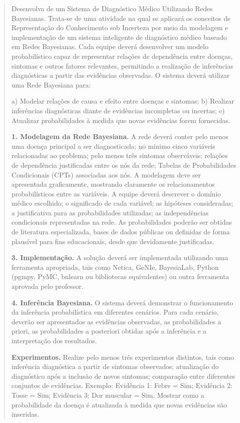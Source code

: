 \documentclass[12pt, a4paper]{article}
\begin{document}
\begin{quote}
Desenvolva de um Sistema de Diagnóstico Médico Utilizando Redes Bayesianas. Trata-se de uma atividade na qual se aplicará os conceitos de Representação do Conhecimento sob Incerteza por meio da modelagem e implementação de um sistema inteligente de diagnóstico médico baseado em Redes Bayesianas. Cada equipe deverá desenvolver um modelo probabilístico capaz de representar relações de dependência entre doenças, sintomas e outros fatores relevantes, permitindo a realização de inferências diagnósticas a partir das evidências observadas. O sistema deverá utilizar uma Rede Bayesiana para:

a) Modelar relações de causa e efeito entre doenças e sintomas; b) Realizar inferências diagnósticas diante de evidências incompletas ou incertas; c) Atualizar probabilidades à medida que novas evidências forem fornecidas.

\textbf{1. Modelagem da Rede Bayesiana.} A rede deverá conter pelo menos uma doença principal a ser diagnosticada; no mínimo cinco variáveis relacionadas ao problema; pelo menos três sintomas observáveis; relações de dependência justificadas entre os nós da rede; Tabelas de Probabilidades Condicionais (CPTs) associadas aos nós. A modelagem deve ser apresentada graficamente, mostrando claramente os relacionamentos probabilísticos entre as variáveis. A equipe deverá descrever o domínio médico escolhido; o significado de cada variável; as hipóteses consideradas; a justificativa para as probabilidades utilizadas; as independências condicionais representadas na rede. As probabilidades poderão ser obtidas de literatura especializada, bases de dados públicas ou definidas de forma plausível para fins educacionais, desde que devidamente justificadas.

\textbf{3. Implementação.} A solução deverá ser implementada utilizando uma ferramenta apropriada, tais como Netica, GeNIe, BayesiaLab, Python (pgmpy, PyMC, bnlearn ou bibliotecas equivalentes) ou outra ferramenta aprovada pelo professor.

\textbf{4. Inferência Bayesiana.} O sistema deverá demonstrar o funcionamento da inferência probabilística em diferentes cenários. Para cada cenário, deverão ser apresentados as evidências observadas, as probabilidades a priori, as probabilidades a posteriori obtidas após a inferência e a interpretação dos resultados.

\textbf{Experimentos.} Realize pelo menos três experimentos distintos, tais como inferência diagnóstica a partir de sintomas observados; atualização do diagnóstico após a inclusão de novos sintomas; comparação entre diferentes conjuntos de evidências. Exemplo: Evidência 1: Febre = Sim; Evidência 2: Tosse = Sim; Evidência 3: Dor muscular = Sim. Mostrar como a probabilidade da doença é atualizada à medida que novas evidências são inseridas.


\end{quote}
\end{document}
